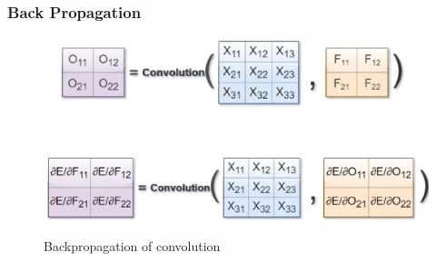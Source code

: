 \documentclass{ctexbeamer}
\begin{document}
\begin{frame}
  \frametitle{Back Propagation}
  \begin{figure}[H]
    \centering
    \includegraphics[width=\textwidth]{./figures/bp.png}
    \caption{Backpropagation of convolution}
    \label{fig:bp}
  \end{figure}
\end{frame}
\end{document}

